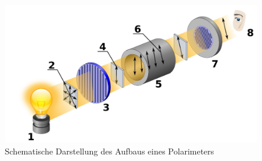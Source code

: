 \begin{figure}
\centering
\includegraphics[width=\textwidth]{polarimeter.png}
\caption{Schematische Darstellung des Aufbaus eines Polarimeters}
\label{abb:polarimeter}
\end{figure}
